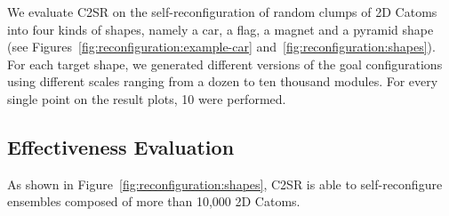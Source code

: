We evaluate C2SR on the self-reconfiguration of random clumps of 2D Catoms into four kinds of shapes, namely a car, a flag, a magnet and a pyramid shape (see Figures~\ref{fig:reconfiguration:example-car} and~\ref{fig:reconfiguration:shapes}). For each target shape, we generated different versions of the goal configurations using different scales ranging from a dozen to ten thousand modules. For every single point on the result plots, 10 were performed.

\subsection{Effectiveness Evaluation}

As shown in Figure~\ref{fig:reconfiguration:shapes}, C2SR is able to self-reconfigure ensembles composed of more than 10,000 2D Catoms.


